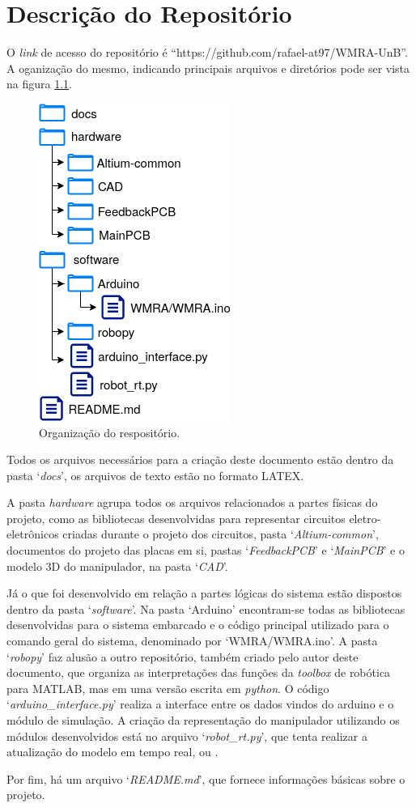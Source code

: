 
\chapter{Descrição do Repositório}

\label{Anexo-Repositorio}

O \textit{link} de acesso do repositório é ``https://github.com/rafael-at97/WMRA-UnB''. A 
oganização do mesmo, indicando principais arquivos e diretórios pode ser vista na figura
\ref{fig:repositorio}.

\begin{figure}[h]
    \caption{Organização do respositório.}    

    \begin{centering}
        \includegraphics[width=0.3\columnwidth]{images/anexo/repositorio.png} 
    \par\end{centering}

    \label{fig:repositorio}
\end{figure}

Todos os arquivos necessários para a criação deste documento estão dentro da pasta `\textit{docs}',
os arquivos de texto estão no formato LATEX.

A pasta \textit{hardware} agrupa todos os arquivos relacionados a partes físicas do projeto,
como as bibliotecas desenvolvidas para representar circuitos eletro-eletrônicos criadas
durante o projeto dos circuitos, pasta `\textit{Altium-common}', documentos do projeto das 
placas em si, pastas `\textit{FeedbackPCB}' e `\textit{MainPCB}' e o modelo 3D do manipulador, na 
pasta `\textit{CAD}'.

Já o que foi desenvolvido em relação a partes lógicas do sistema estão dispostos dentro da pasta
`\textit{software}'. Na pasta `Arduino' encontram-se todas as bibliotecas desenvolvidas para o 
sistema embarcado e o código principal utilizado para o comando geral do sistema, denominado
por `WMRA/WMRA.ino'. A pasta `\textit{robopy}' faz alusão a outro repositório, também criado pelo
autor deste documento, que organiza as interpretações das funções da \textit{toolbox} de robótica
para MATLAB, mas em uma versão escrita em \textit{python}. O código `\textit{arduino\_interface.py}'
realiza a interface entre os dados vindos do arduino e o módulo de simulação. A criação da representação
do manipulador utilizando os módulos desenvolvidos está no arquivo `\textit{robot\_rt.py}', que tenta 
realizar a atualização do modelo em tempo real, ou .

Por fim, há um arquivo `\textit{README.md}', que fornece informações básicas sobre o projeto.
